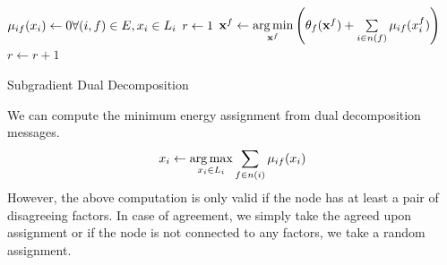 \documentclass[letterpaper, 10 pt, conference]{ieeeconf} %
\DeclareMathOperator*{\argmin}{arg\,min}
\DeclareMathOperator*{\argmax}{arg\,max}
\newcommand{\vect}[1]{\mathbf{#1}}
\begin{document}
\begin{algorithm}
  \DontPrintSemicolon

  $\msg{i}{f}{x_i} \assign 0 \hfill \forall (i, f) \in E, x_i \in \Sx$\;
  $r \leftarrow 1$\;
   {
     {%
      $\vect{x}^f \assign \argmin\limits_{\vect{x}^f} \left( \theta_f(\vect{x}^f) + \sum\limits_{i \in n(f)}\msg{i}{f}{x^f_i} \right)$\;
    }
     {
    }
    $r \leftarrow r + 1$\;
  }
  \label{alg:dualdecompostion}
  \caption{Subgradient Dual Decomposition}
\end{algorithm}
We can compute the minimum energy assignment from dual decomposition messages.
\begin{align}
  x_i \assign \argmax\limits_{x_i \in \Sx} \sum\limits_{f \in n(i)} \msg{i}{f}{x_i}
\end{align}
However, the above computation is only valid if the node has at least a pair of disagreeing factors. In case of agreement, we simply take the agreed upon assignment or if the node is not connected to any factors, we take a random assignment.
\end{document}
